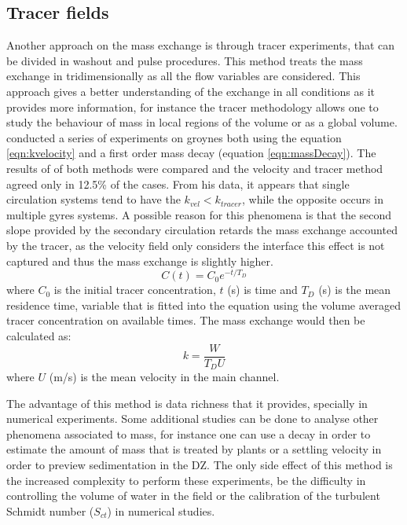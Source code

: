 \documentclass[../main.tex]{subfiles}
\begin{document}
\subsection{Tracer fields}
Another approach on the mass exchange is through tracer experiments, that can be divided in washout and pulse procedures.  This method treats the mass exchange in tridimensionally as all the flow variables are considered. This approach gives a better understanding of the exchange in all conditions as it provides more information, for instance the tracer methodology allows one to study the behaviour of mass in local regions of the volume or as a global volume. \textcite{weitbrecht2004} conducted a series of experiments on groynes both using the equation \ref{eqn:kvelocity} and a first order mass decay (equation \ref{eqn:massDecay}). The results of of both methods were compared and the velocity and tracer method agreed only in 12.5\% of the cases. From his data, it appears that single circulation systems tend to have the $k_{vel} < k_{tracer}$, while the opposite occurs in multiple gyres systems. A possible reason for this phenomena is that the second slope provided by the secondary circulation retards the mass exchange accounted by the tracer, as the velocity field only considers the interface this effect is not captured and thus the mass exchange is slightly higher.
\begin{equation}
C(t)=C_0e^{-t/T_D}
\label{eqn:massDecay}
\end{equation}
where $C_0$ is the initial tracer concentration, $t$ (s) is time and $T_D$ (s) is the mean residence time, variable that is fitted into the equation using the volume averaged tracer concentration on available times. The mass exchange would then be calculated as:
\begin{equation}
k=\frac{W}{T_D U}
\label{eqn:ktracer}
\end{equation}
where $U$ (m/s) is the mean velocity in the main channel.

The advantage of this method is data richness that it provides, specially in numerical experiments. Some additional studies can be done to analyse other phenomena associated to mass, for instance one can use a decay in order to estimate the amount of mass that is treated by plants or a settling velocity in order to preview sedimentation in the DZ. The only side effect of this method is the increased complexity to perform these experiments, be the difficulty in controlling the volume of water in the field or the calibration of the turbulent Schmidt number ($S_{ct}$) in numerical studies. 
\end{document}
